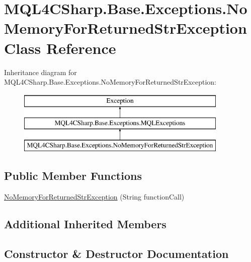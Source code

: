 \hypertarget{class_m_q_l4_c_sharp_1_1_base_1_1_exceptions_1_1_no_memory_for_returned_str_exception}{}\section{M\+Q\+L4\+C\+Sharp.\+Base.\+Exceptions.\+No\+Memory\+For\+Returned\+Str\+Exception Class Reference}
\label{class_m_q_l4_c_sharp_1_1_base_1_1_exceptions_1_1_no_memory_for_returned_str_exception}
Inheritance diagram for M\+Q\+L4\+C\+Sharp.\+Base.\+Exceptions.\+No\+Memory\+For\+Returned\+Str\+Exception\+:\begin{figure}[H]
\begin{center}
\leavevmode
\includegraphics[height=3.000000cm]{class_m_q_l4_c_sharp_1_1_base_1_1_exceptions_1_1_no_memory_for_returned_str_exception}
\end{center}
\end{figure}
\subsection*{Public Member Functions}
\begin{DoxyCompactItemize}
\item 
\hyperlink{class_m_q_l4_c_sharp_1_1_base_1_1_exceptions_1_1_no_memory_for_returned_str_exception_a7db87acac150b0a70f90c16a13e9813b}{No\+Memory\+For\+Returned\+Str\+Exception} (String function\+Call)
\end{DoxyCompactItemize}
\subsection*{Additional Inherited Members}


\subsection{Constructor \& Destructor Documentation}
